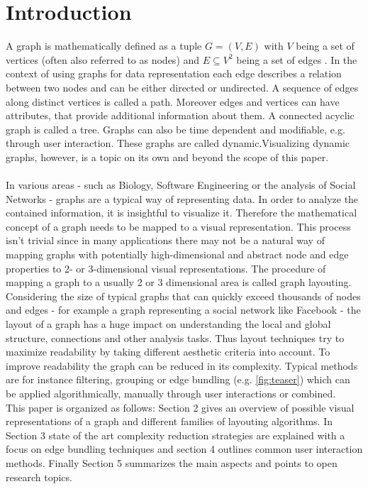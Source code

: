 \section{Introduction}
A graph is mathematically defined as a tuple $ G = (V, E)$ with $V$ being a set of vertices (often also referred to as nodes) and $E \subseteq V^2$ being a set of edges \cite{Al-Taie2017}. In the context of using graphs for data representation each edge describes a relation between two nodes and can be either directed or undirected. A sequence of edges along distinct vertices is called a path. Moreover edges and vertices can have attributes, that provide additional information about them. A connected acyclic graph is called a tree. Graphs can also be time dependent and modifiable, e.g. through user interaction. These graphs are called dynamic.Visualizing dynamic graphs, however, is a topic on its own and beyond the scope of this paper.\\
\\
In various areas - such as Biology, Software Engineering or the analysis of Social Networks - graphs are a typical way of representing data. In order to analyze the contained information, it is insightful to visualize it. Therefore the mathematical concept of a graph needs to be mapped to a visual representation. This process isn't trivial since in many applications there may not be a natural way of mapping graphs with potentially high-dimensional and abstract node and edge properties to 2- or 3-dimensional visual representations.
The procedure of mapping a graph to a usually 2 or 3 dimensional area is called graph layouting. 
Considering the size of typical graphs that can quickly exceed thousands of nodes and edges - for example a graph representing a social network like Facebook -  the layout of a graph has a huge impact on understanding the local and global structure, connections and other analysis tasks. Thus layout techniques try to maximize readability by taking different aesthetic criteria into account. To improve readability the graph can be reduced in its complexity. Typical methods are for instance filtering, grouping or edge bundling (e.g. \autoref{fig:teaser}) which can be applied algorithmically, manually through user interactions or combined. \\ This paper is organized as follows: Section 2 gives an overview of possible visual representations of a graph and different families of layouting algorithms. In Section 3 state of the art complexity reduction strategies are explained with a focus on edge bundling techniques and section 4 outlines common user interaction methods. Finally Section 5 summarizes the main aspects and points to open research topics.

